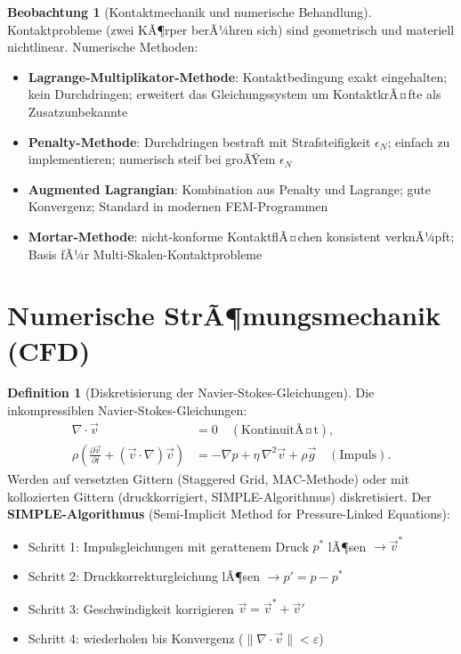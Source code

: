 ﻿\documentclass[a4paper,12pt]{report}
\theoremstyle{definition}
\newtheorem{definition}{Definition}
\newtheorem{beobachtung}{Beobachtung}
\begin{document}
\begin{beobachtung}[Kontaktmechanik und numerische Behandlung]
Kontaktprobleme (zwei KÃ¶rper berÃ¼hren sich) sind geometrisch und materiell
nichtlinear. Numerische Methoden:
\begin{itemize}
    \item[-] \textbf{Lagrange-Multiplikator-Methode}: Kontaktbedingung exakt
          eingehalten; kein Durchdringen; erweitert das Gleichungssystem um
          KontaktkrÃ¤fte als Zusatzunbekannte
    \item[-] \textbf{Penalty-Methode}: Durchdringen bestraft mit Strafsteifigkeit $\epsilon_N$;
          einfach zu implementieren; numerisch steif bei groÃŸem $\epsilon_N$
    \item[-] \textbf{Augmented Lagrangian}: Kombination aus Penalty und
          Lagrange; gute Konvergenz; Standard in modernen FEM-Programmen
    \item[-] \textbf{Mortar-Methode}: nicht-konforme KontaktflÃ¤chen konsistent
          verknÃ¼pft; Basis fÃ¼r Multi-Skalen-Kontaktprobleme
\end{itemize}
\end{beobachtung}

\section{Numerische StrÃ¶mungsmechanik (CFD)}

\begin{definition}[Diskretisierung der Navier-Stokes-Gleichungen]
Die inkompressiblen Navier-Stokes-Gleichungen:
\begin{align*}
  \nabla\cdot\vec{v} &= 0 \quad (\text{KontinuitÃ¤t}),\\
  \rho\left(\frac{\partial\vec{v}}{\partial t} + (\vec{v}\cdot\nabla)\vec{v}\right)
  &= -\nabla p + \eta\,\nabla^2\vec{v} + \rho\vec{g} \quad (\text{Impuls}).
\end{align*}
Werden auf versetzten Gittern (Staggered Grid, MAC-Methode) oder
mit kollozierten Gittern (druckkorrigiert, SIMPLE-Algorithmus) diskretisiert.
Der \textbf{SIMPLE-Algorithmus} (Semi-Implicit Method for Pressure-Linked Equations):
\begin{itemize}
    \item[-] Schritt 1: Impulsgleichungen mit gerattenem Druck $p^*$ lÃ¶sen $\to \vec{v}^*$
    \item[-] Schritt 2: Druckkorrekturgleichung lÃ¶sen $\to p' = p - p^*$
    \item[-] Schritt 3: Geschwindigkeit korrigieren $\vec{v} = \vec{v}^* + \vec{v}'$
    \item[-] Schritt 4: wiederholen bis Konvergenz ($\|\nabla\cdot\vec{v}\| < \varepsilon$)
\end{itemize}
\end{definition}
\end{document}
